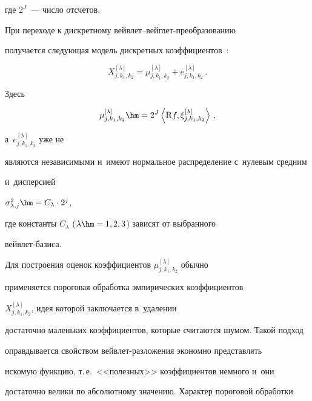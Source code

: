 где $2^J$~--- число отсчетов.





При переходе к дискретному вейв\-лет--вейг\-лет-пре\-об\-ра\-зо\-ва\-нию 


получается следующая модель дискретных коэффициентов~\cite{ZaSh18}:


\begin{equation*}




X_{j,k_1,k_2}^{[\lambda]} = \mu_{j,k_1,k_2}^{[\lambda]} +  


e_{j,k_1,k_2}^{[\lambda]}\,. %


\end{equation*}


Здесь 


$$


\mu_{j,k_1,k_2}^{[\lambda]} \hm=  2^J\left\langle \Radon f, 


\xi_{j,k_1,k_2}^{[\lambda]}\right\rangle\,,


$$


 а~$e_{j,k_1,k_2}^{[\lambda]}$ уже не 


являются независимыми и~имеют нормальное распределение с~нулевым средним 


и~дисперсией


$\sigma_{\lambda,j}^2\hm=C_{\lambda}\cdot 2^{j}$, %




где константы $C_{\lambda}$ ($\lambda\hm=1, 2, 3$) зависят от  выбранного  


вейв\-лет-ба\-зиса.





Для построения оценок коэффициентов $\mu_{j,k_1,k_2}^{[\lambda]}$ обычно 


применяется пороговая обработка эмпирических коэффициентов 


$X_{j,k_1,k_2}^{[\lambda]}$, идея которой заключается в~удалении 


достаточно маленьких коэффициентов, которые считаются шумом. Такой подход 


оправдывается свойством вейв\-лет-раз\-ло\-же\-ния экономно представлять 


искомую функцию, т.\,е.\ <<полезных>> коэффициентов немного и~они 


достаточно велики по абсолютному значению. Характер пороговой обработки 


